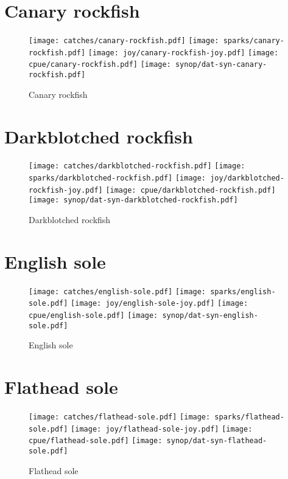 \section*{Canary rockfish}

\begin{figure}[htbp]
\centering
\texttt{[image: catches/canary-rockfish.pdf]}
\texttt{[image: sparks/canary-rockfish.pdf]}
\texttt{[image: joy/canary-rockfish-joy.pdf]}
\texttt{[image: cpue/canary-rockfish.pdf]}
\texttt{[image: synop/dat-syn-canary-rockfish.pdf]}
\caption{Canary rockfish}
\end{figure}
\clearpage
\section*{Darkblotched rockfish}

\begin{figure}[htbp]
\centering
\texttt{[image: catches/darkblotched-rockfish.pdf]}
\texttt{[image: sparks/darkblotched-rockfish.pdf]}
\texttt{[image: joy/darkblotched-rockfish-joy.pdf]}
\texttt{[image: cpue/darkblotched-rockfish.pdf]}
\texttt{[image: synop/dat-syn-darkblotched-rockfish.pdf]}
\caption{Darkblotched rockfish}
\end{figure}
\clearpage
\section*{English sole}

\begin{figure}[htbp]
\centering
\texttt{[image: catches/english-sole.pdf]}
\texttt{[image: sparks/english-sole.pdf]}
\texttt{[image: joy/english-sole-joy.pdf]}
\texttt{[image: cpue/english-sole.pdf]}
\texttt{[image: synop/dat-syn-english-sole.pdf]}
\caption{English sole}
\end{figure}
\clearpage
\section*{Flathead sole}

\begin{figure}[htbp]
\centering
\texttt{[image: catches/flathead-sole.pdf]}
\texttt{[image: sparks/flathead-sole.pdf]}
\texttt{[image: joy/flathead-sole-joy.pdf]}
\texttt{[image: cpue/flathead-sole.pdf]}
\texttt{[image: synop/dat-syn-flathead-sole.pdf]}
\caption{Flathead sole}
\end{figure}
\clearpage
